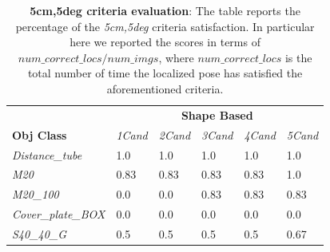 \begin{table}
 \centering
   \begin{tabular}{ llllll }
   &\multicolumn{5}{c}{ \textbf{Shape Based} } \\
   \cmidrule(lr){2-6}
   \textbf{Obj Class} & \emph{1Cand} & \emph{2Cand} & \emph{3Cand} &\emph{4Cand} & \emph{5Cand} \\
   \cmidrule(lr){1-6}   
   \emph{Distance\_tube} & 1.0 & 1.0 & 1.0 & 1.0 & 1.0 \\ 
   \emph{M20} & 0.83 & 0.83 & 0.83 & 0.83 & 1.0 \\ 
   \emph{M20\_100} & 0.0 & 0.0 & 0.83 & 0.83 & 0.83 \\
   \emph{Cover\_plate\_BOX} & 0.0 & 0.0 & 0.0 & 0.0 & 0.0 \\
   \emph{S40\_40\_G} & 0.5 & 0.5 & 0.5 & 0.5 & 0.67 \\
   \end{tabular} 
   \caption{\textbf{5cm,5deg criteria evaluation}: The table reports the percentage of the \emph{5cm,5deg} criteria satisfaction. In particular here we reported the scores in terms of $num\_correct\_locs / num\_imgs$, where $num\_correct\_locs$ is the total number of time the localized pose has satisfied the aforementioned criteria.}
 \label{tab:table_5cm_5deg}
\end{table}

